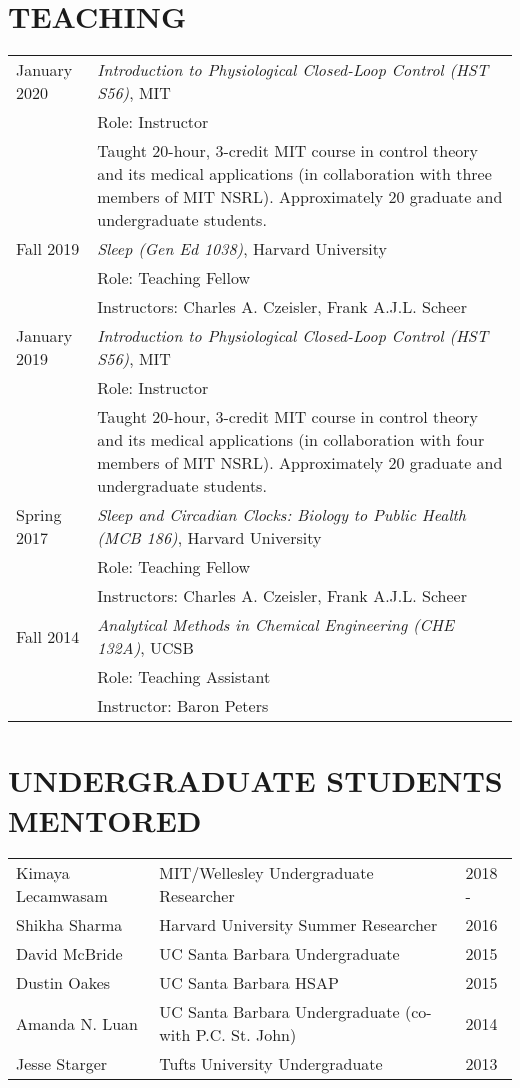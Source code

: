 \documentclass[line,10pt]{res}
\begin{document}
\begin{resume}
\section{\bf TEACHING}
\vspace{1em}
\begin{tabular}{p{0.9in} p{5.1in}}
January 2020 & \textit{Introduction to Physiological Closed-Loop Control (HST S56)}, MIT\\
 & Role: Instructor\\
 & Taught 20-hour, 3-credit MIT course in control theory and its medical applications (in collaboration with three members of MIT NSRL). Approximately 20 graduate and undergraduate students.\\[0.5em]
Fall 2019 & \textit{Sleep (Gen Ed 1038)}, Harvard University\\
 & Role: Teaching Fellow\\
 & Instructors: Charles A. Czeisler, Frank A.J.L. Scheer\\[0.5em]
January 2019 & \textit{Introduction to Physiological Closed-Loop Control (HST S56)}, MIT\\
 & Role: Instructor\\
 & Taught 20-hour, 3-credit MIT course in control theory and its medical applications (in collaboration with four members of MIT NSRL). Approximately 20 graduate and undergraduate students.\\[0.5em]
Spring 2017 & \textit{Sleep and Circadian Clocks: Biology to Public Health (MCB 186)}, Harvard University\\
 & Role: Teaching Fellow\\
 & Instructors: Charles A. Czeisler, Frank A.J.L. Scheer\\[0.5em]
Fall 2014 & \textit{Analytical Methods in Chemical Engineering (CHE 132A)}, UCSB\\
 & Role: Teaching Assistant\\
 & Instructor: Baron Peters
\end{tabular}

\section{\bf UNDERGRADUATE STUDENTS MENTORED}
\vspace{1em}
\begin{tabular}{p{1.5in} p{3.5in} p{1.0in}}
Kimaya Lecamwasam & MIT/Wellesley Undergraduate Researcher & 2018 - \\
Shikha Sharma & Harvard University Summer Researcher & 2016\\
David McBride & UC Santa Barbara Undergraduate & 2015\\
Dustin Oakes & UC Santa Barbara HSAP & 2015\\
Amanda N. Luan & UC Santa Barbara Undergraduate (co- with P.C. St. John) & 2014\\
Jesse Starger & Tufts University Undergraduate & 2013
\end{tabular}


\end{resume}
\end{document}
